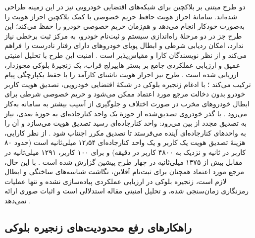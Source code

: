 دو طرح مبتنی بر بلاکچین برای شبکه‌های اقتضایی خودرویی نیز در این زمینه طراحی شده‌اند. سامانهٔ احراز هویت حافظ حریم خصوصی با کمک بلاکچین احراز هویت را به‌صورت خودکار انجام می‌دهد و هم‌زمان حریم خصوصی خودرو را حفظ می‌کند؛ این طرح جز در دو مرحلهٔ راه‌اندازی سیستم و ثبت‌نام خودرو، به مرکز ثبت برخطی نیاز ندارد، امکان ردیابی شرطی و ابطال پویای خودروهای دارای رفتار نادرست را فراهم می‌کند و از نظر نویسندگان کارا و مقیاس‌پذیر است \cite{fengBPASBlockchainAssistedPrivacyPreserving2020}. امنیت این طرح با تحلیل امنیتی عمیق و ارزیابی عملکردی جامع بر بستر هایپرلج فراب، یک زنجیرهٔ بلوکی مجوزدار، ارزیابی شده است \cite{fengBPASBlockchainAssistedPrivacyPreserving2020}. طرح  نیز احراز هویت ناشنای کارآمد را با حفظ یکپارچگی پیام ترکیب می‌کند \cite{mariaBAIVEfficientBlockchainBased2022}؛ با ادغام زنجیره بلوکی در شبکهٔ اقتضایی خودرویی، تصدیق هویت کاربر خودرو بدون دخالت مرجع مورد اعتماد ممکن می‌شود و حریم خصوصی شرطی برای ابطال خودروهای مخرب در صورت اختلاف و جلوگیری از آسیب بیشتر به سامانه به‌کار می‌رود \cite{mariaBAIVEfficientBlockchainBased2022}. با گذر خودروی تصدیق‌شده از حوزهٔ یک واحد کنارجاده‌ای به حوزهٔ بعدی، نیاز به تصدیق مجدد از بین می‌رود: واحد کنارجاده‌ای رسید تصدیق هویت می‌سازد و آن را به واحدهای کنارجاده‌ای آینده می‌فرستد تا تصدیق مکرر اجتناب شود \cite{mariaBAIVEfficientBlockchainBased2022}. از نظر کارایی، هزینهٔ تصدیق هویت یک کاربر و یک واحد کنارجاده‌ای ۱۲٫۵۴ میلی‌ثانیه است (حدود ۸۰ کاربر در ثانیه و نزدیک به ۴۸۰۰ کاربر در دقیقه) و برای ۱۰۰ کاربر، ۱۲۹۱ میلی‌ثانیه در مقابل بیش از ۱۳۷۵ میلی‌ثانیه در چهار طرح پیشین گزارش شده است \cite{mariaBAIVEfficientBlockchainBased2022}. با این حال، مرجع مورد اعتماد همچنان برای ثبت‌نام آفلاین، نگاشت شناسه‌های ساختگی و ابطال لازم است، زنجیره بلوکی در ارزیابی عملکردی پیاده‌سازی نشده و تنها عملیات رمزنگاری زمان‌سنجی شده، و تحلیل امنیتی مقاله استدلالی است و اثبات صوری ارائه نمی‌دهد \cite{mariaBAIVEfficientBlockchainBased2022}.

\subsection{راهکارهای رفع محدودیت‌های زنجیره بلوکی}

